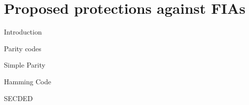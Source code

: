\section{Proposed protections against FIAs}

\begin{frame}{Introduction}

\end{frame}
\begin{frame}{Parity codes}
    
\end{frame}
\begin{frame}{Simple Parity}
    
\end{frame}
\begin{frame}{Hamming Code}
    
\end{frame}
\begin{frame}{SECDED}
    
\end{frame}
